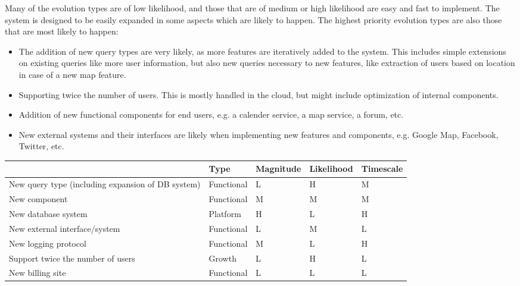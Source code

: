 Many of the evolution types are of low likelihood, and those that are of medium
or high likelihood are easy and fast to implement. The system is designed to be
easily expanded in some aspects which are likely to happen. The highest
priority evolution types are also those that are most likely to happen:

\begin{itemize}
\item The addition of new query types are very likely, as more features are
iteratively added to the system. This includes simple extensions on existing
queries like more user information, but also new queries necessary to new
features, like extraction of users based on location in case of a new map
feature.  
\item Supporting twice the number of users. This is mostly handled in the
    cloud, but might include optimization of internal components.
\item Addition of new functional components for end users, e.g. a calender
service, a map service, a forum, etc.  \item New external systems and their
    interfaces are likely when implementing new features and components, e.g.
    Google Map, Facebook, Twitter, etc. 
\end{itemize}

\begin{table}[ht]
    \centering
    \begin{tabular}{| p{5cm} | l | l | l | l |}
            & Type & Magnitude & Likelihood & Timescale \\ \hline \hline
        New query type (including expansion of DB system) & Functional & L & H
            & M \\ \hline New component & Functional & M & M & M \\ \hline
        New database system & Platform & H & L & H \\ \hline
        New external interface/system & Functional & L & M & L \\ \hline
        New logging protocol & Functional & M & L & H \\ \hline
        Support twice the number of users & Growth & L & H & L \\ \hline
        New billing site & Functional & L & L & L \\ \hline
    \end{tabular}
    \label{tab:evolution}
\end{table}


